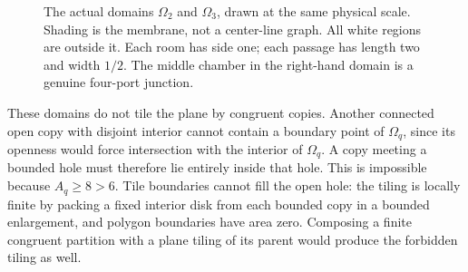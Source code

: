 \documentclass[11pt,reqno]{amsart}
\numberwithin{equation}{section}
\newcommand{\Om}{\Omega}
\begin{document}
\begin{figure}[tb]
\centering
{}
\caption{The actual domains $\Om_2$ and $\Om_3$, drawn at the same
physical scale. Shading is the membrane, not a center-line graph.
All white regions are outside it. Each room has side one; each
passage has length two and width $1/2$. The middle chamber in
the right-hand domain is a genuine four-port junction.}
\label{fig:grid}
\end{figure}

These domains do not tile the plane by congruent copies. Another
connected open copy with disjoint interior cannot contain a boundary
point of $\Om_q$, since its openness would force intersection with
the interior of $\Om_q$. A copy meeting a bounded hole must therefore
lie entirely inside that hole. This is impossible because $A_q\ge8>6$.
Tile boundaries cannot fill the open hole: the tiling is locally
finite by packing a fixed interior disk from each bounded copy in a
bounded enlargement, and polygon boundaries have area zero. Composing
a finite congruent partition with a plane tiling of its parent would
produce the forbidden tiling as well.
\end{document}
